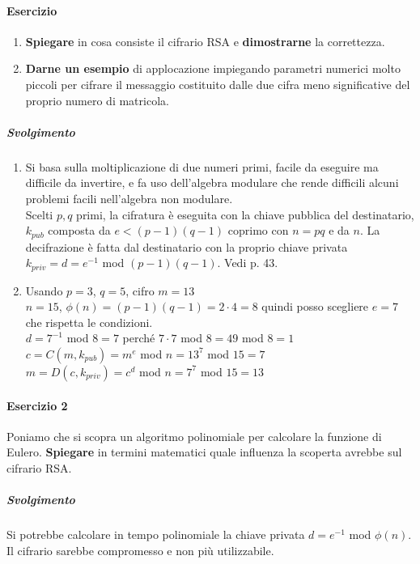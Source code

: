 \documentclass[10pt]{book}
\begin{document}
\paragraph{Esercizio} \begin{enumerate}
	\item \textbf{Spiegare} in cosa consiste il cifrario RSA e \textbf{dimostrarne} la correttezza.
	\item \textbf{Darne un esempio} di applocazione impiegando parametri numerici molto piccoli per cifrare il messaggio costituito dalle due cifra meno significative del proprio numero di matricola.
\end{enumerate}
\subparagraph{Svolgimento} \begin{enumerate}
	\item Si basa sulla moltiplicazione di due numeri primi, facile da eseguire ma difficile da invertire, e fa uso dell'algebra modulare che rende difficili alcuni problemi facili nell'algebra non modulare.\\
	Scelti $p,q$ primi, la cifratura è eseguita con la chiave pubblica del destinatario, $k_{pub}$ composta da $e < (p-1)(q-1)$ coprimo con $n = pq$ e da $n$. La decifrazione è fatta dal destinatario con la proprio chiave privata $k_{priv} = d = e^{-1}$ mod $(p-1)(q-1)$. Vedi p. 43.
	\item Usando $p = 3$, $q = 5$, cifro $m = 13$\\
	$n = 15$, $\phi(n) = (p-1)(q-1) = 2\cdot4 = 8$ quindi posso scegliere $e = 7$ che rispetta le condizioni.\\
	$d = 7^{-1}$ mod $8 = 7$ perché $7\cdot 7$ mod $8 = 49$ mod $8 = 1$\\
	$c = C(m, k_{pub}) = m^e$ mod $n = 13^7$ mod $15 = 7$\\
	$m = D(c, k_{priv}) = c^d$ mod $n = 7^7$ mod $15 = 13$
\end{enumerate}
\paragraph{Esercizio 2} Poniamo che si scopra un algoritmo polinomiale per calcolare la funzione di Eulero. \textbf{Spiegare} in termini matematici quale influenza la scoperta avrebbe sul cifrario RSA.
\subparagraph{Svolgimento} Si potrebbe calcolare in tempo polinomiale la chiave privata $d = e^{-1}$ mod $\phi(n)$. Il cifrario sarebbe compromesso e non più utilizzabile.
\end{document}
